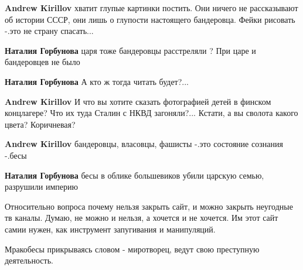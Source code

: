 \begin{itemize}
\begin{itemize}
\textbf{Andrew Kirillov} хватит глупые картинки постить. Они ничего не рассказывают об истории СССР, они лишь о глупости настоящего бандеровца. Фейки рисовать -.это не страну спасать...

\textbf{Наталия Горбунова} царя тоже бандеровцы расстреляли ? При царе и бандеровцев не было

\textbf{Наталия Горбунова} А кто ж тогда читать будет?...

\textbf{Andrew Kirillov} И что вы хотите сказать фотографией детей в финском концлагере? Что их туда Сталин с НКВД загоняли?...
Кстати, а вы сволота какого цвета? Коричневая?

\textbf{Andrew Kirillov} бандеровцы, власовцы, фашисты -.это состояние сознания -.бесы

\textbf{Наталия Горбунова} бесы в облике большевиков убили царскую семью, разрушили империю

\end{itemize} %


Относительно вопроса почему нельзя закрыть сайт, и можно закрыть неугодные тв
каналы. Думаю, не можно и нельзя, а хочется и не хочется. Им этот сайт самии
нужен, как инструмент запугивания и манипуляций.


Мракобесы прикрываясь словом - миротворец, ведут свою преступную деятельность.

\end{itemize} %

